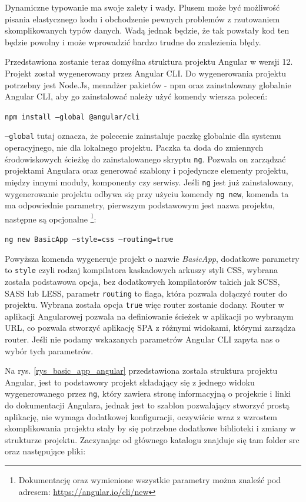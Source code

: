 \documentclass[12pt,a4paper,oneside]{book}
\begin{document}
Dynamiczne typowanie ma swoje zalety i wady. Plusem może być możliwość pisania elastycznego kodu i obchodzenie pewnych problemów z rzutowaniem skomplikowanych typów danych. Wadą jednak będzie, że tak powstały kod ten będzie powolny i może wprowadzić bardzo trudne do znalezienia błędy.

Przedstawiona zostanie teraz domyślna struktura projektu Angular w wersji 12. Projekt został wygenerowany przez Angular CLI. Do wygenerowania projektu potrzebny jest Node.Js, menadżer pakietów - npm oraz zainstalowany globalnie Angular CLI, aby go zainstalować należy użyć komendy wiersza poleceń:
\begin{center}
  \texttt{npm install --global @angular/cli}
\end{center}
\texttt{--global} tutaj oznacza, że polecenie zainstaluje paczkę globalnie dla systemu operacyjnego, nie dla lokalnego projektu. Paczka ta doda do zmiennych środowiskowych ścieżkę do zainstalowanego skryptu \texttt{ng}. Pozwala on zarządzać projektami Angulara oraz generować szablony i pojedyncze elementy projektu, między innymi moduły, komponenty czy serwisy. Jeśli \texttt{ng} jest już zainstalowany, wygenerowanie projektu odbywa się przy użyciu komendy \texttt{ng new}, komenda ta ma odpowiednie parametry, pierwszym podstawowym jest nazwa projektu, następne są opcjonalne \footnote{Dokumentację oraz wymienione wszystkie parametry można znaleźć pod adresem: \url{https://angular.io/cli/new}}:
\begin{center}
  \texttt{ng new BasicApp --style=css --routing=true}
\end{center}
Powyższa komenda wygeneruje projekt o nazwie \textit{BasicApp}, dodatkowe parametry to \texttt{style} czyli rodzaj kompilatora kaskadowych arkuszy styli CSS, wybrana została podstawowa opcja, bez dodatkowych kompilatorów takich jak SCSS, SASS lub LESS, parametr \texttt{routing} to flaga, która pozwala dołączyć router do projektu. Wybrana została opcja \texttt{true} więc router zostanie dodany. Router w aplikacji Angularowej pozwala na definiowanie ścieżek w aplikacji po wybranym URL, co pozwala stworzyć aplikację SPA z różnymi widokami, którymi zarządza router. Jeśli nie podamy wskazanych parametrów Angular CLI zapyta nas o wybór tych parametrów.

Na rys. \ref{rys_basic_app_angular} przedstawiona została struktura projektu Angular, jest to podstawowy projekt składający się z jednego widoku wygenerowanego przez \texttt{ng}, który zawiera stronę informacyjną o projekcie i linki do dokumentacji Angulara, jednak jest to szablon pozwalający stworzyć prostą aplikację, nie wymaga dodatkowej konfiguracji, oczywiście wraz z wzrostem skomplikowania projektu stały by się potrzebne dodatkowe biblioteki i zmiany w strukturze projektu. Zaczynając od głównego katalogu znajduje się tam folder src oraz następujące pliki:
\end{document}
